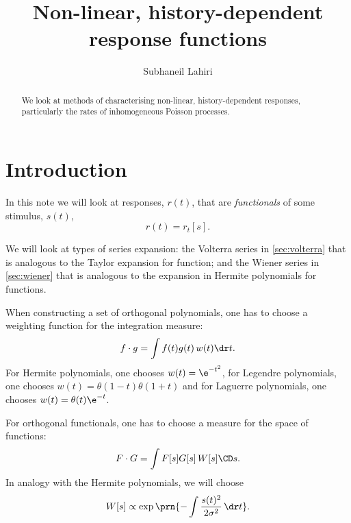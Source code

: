 \documentclass[12pt]{article}
\title{Non-linear, history-dependent response functions}
\author{Subhaneil Lahiri
%
%
%
}
\begin{document}
\maketitle



\begin{abstract}
  We look at methods of characterising non-linear, history-dependent responses, particularly the rates of inhomogeneous Poisson processes.
\end{abstract}



\section{Introduction}\label{sec:intro}

In this note we will look at responses, $r(t)$, that are \emph{functionals} of some stimulus, $s(t)$,
%
\begin{equation}\label{eq:response}
  r(t) = r_t[s].
\end{equation}
%

We will look at types of series expansion: the Volterra series in \cref{sec:volterra} that is analogous to the Taylor expansion for function; and the Wiener series in \cref{sec:wiener} that is analogous to the expansion in Hermite polynomials for functions.

When constructing a set of orthogonal polynomials, one has to choose a weighting function for the integration measure:
%
\begin{equation}\label{eq:functionprod}
  f \cdot g = \int f(t) g(t)\, w(t) \dr t.
\end{equation}
%
For Hermite polynomials, one chooses $w(t)=\e^{-t^2}$, for Legendre polynomials, one chooses $w(t)=\theta(1-t)\theta(1+t)$ and for Laguerre polynomials, one chooses $w(t)=\theta(t)\e^{-t}$.

For orthogonal functionals, one has to choose a measure for the space of functions:
%
\begin{equation}\label{eq:functionalprod}
  F \cdot G = \int F[s] G[s]\, W[s] \CD s.
\end{equation}
%
In analogy with the Hermite polynomials, we will choose
%
\begin{equation}\label{eq:whitenoisemeasure}
  W[s] \propto \exp\prn{-\int \frac{s(t)^2}{2\sigma^2}\,\dr t}.
\end{equation}
%
\end{document}
